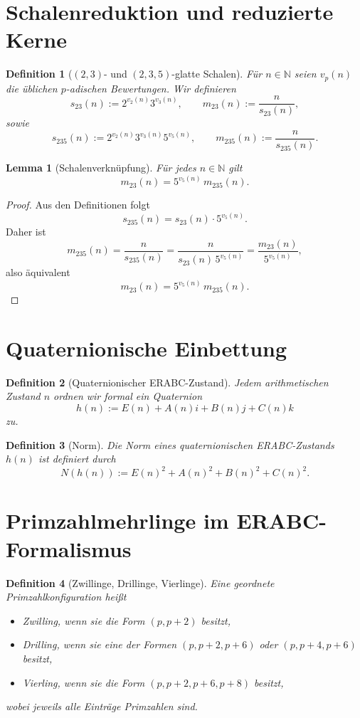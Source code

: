\documentclass[11pt,a4paper]{article}
\newtheorem{definition}{Definition}
\newtheorem{lemma}{Lemma}
\begin{document}
\section{Schalenreduktion und reduzierte Kerne}

\begin{definition}[$(2,3)$- und $(2,3,5)$-glatte Schalen]
Für $n\in\mathbb N$ seien $v_p(n)$ die üblichen $p$-adischen Bewertungen. Wir definieren
\[
s_{23}(n):=2^{v_2(n)}3^{v_3(n)},
\qquad
m_{23}(n):=\frac{n}{s_{23}(n)},
\]
sowie
\[
s_{235}(n):=2^{v_2(n)}3^{v_3(n)}5^{v_5(n)},
\qquad
m_{235}(n):=\frac{n}{s_{235}(n)}.
\]
\end{definition}

\begin{lemma}[Schalenverknüpfung]
Für jedes $n\in\mathbb N$ gilt
\[
m_{23}(n)=5^{v_5(n)}\,m_{235}(n).
\]
\end{lemma}

\begin{proof}
Aus den Definitionen folgt
\[
s_{235}(n)=s_{23}(n)\cdot 5^{v_5(n)}.
\]
Daher ist
\[
m_{235}(n)=\frac{n}{s_{235}(n)}
=\frac{n}{s_{23}(n)\,5^{v_5(n)}}
=\frac{m_{23}(n)}{5^{v_5(n)}},
\]
also äquivalent
\[
m_{23}(n)=5^{v_5(n)}\,m_{235}(n).
\]
\end{proof}

\section{Quaternionische Einbettung}

\begin{definition}[Quaternionischer ERABC-Zustand]
Jedem arithmetischen Zustand $n$ ordnen wir formal ein Quaternion
\[
h(n):=E(n)+A(n)i+B(n)j+C(n)k
\]
zu.
\end{definition}

\begin{definition}[Norm]
Die Norm eines quaternionischen ERABC-Zustands $h(n)$ ist definiert durch
\[
N(h(n)):=E(n)^2+A(n)^2+B(n)^2+C(n)^2.
\]
\end{definition}

\section{Primzahlmehrlinge im ERABC-Formalismus}

\begin{definition}[Zwillinge, Drillinge, Vierlinge]
Eine geordnete Primzahlkonfiguration heißt
\begin{itemize}[leftmargin=2em]
\item Zwilling, wenn sie die Form $(p,p+2)$ besitzt,
\item Drilling, wenn sie eine der Formen $(p,p+2,p+6)$ oder $(p,p+4,p+6)$ besitzt,
\item Vierling, wenn sie die Form $(p,p+2,p+6,p+8)$ besitzt,
\end{itemize}
wobei jeweils alle Einträge Primzahlen sind.
\end{definition}
\end{document}
